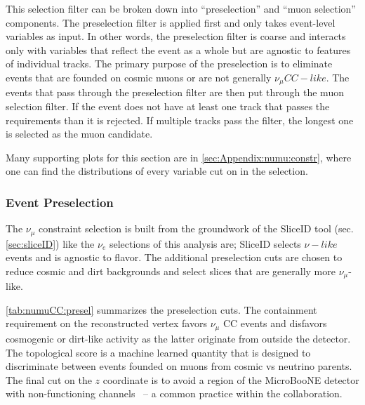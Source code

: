 \par This selection filter can be broken down into ``preselection'' and ``muon selection'' components. The preselection filter is applied first and only takes event-level variables as input. In other words, the preselection filter is coarse and interacts only with variables that reflect the event as a whole but are agnostic to features of individual tracks. The primary purpose of the preselection is to eliminate events that are founded on cosmic muons or are not generally $\nu_{\mu} CC-like$. The events that pass through the preselection filter are then put through the muon selection filter. If the event does not have at least one track that passes the requirements than it is rejected. If multiple tracks pass the filter, the longest one is selected as the muon candidate. 

\par Many supporting plots for this section are in \cref{sec:Appendix:numu:constr}, where one can find the distributions of every variable cut on in the selection. 

\subsubsection{Event Preselection}
\label{sssec:NuMUCCsel:constr:preselec}

\par The $\nu_{\mu}$ constraint selection is built from the groundwork of the SliceID tool (sec. \ref{sec:sliceID}) like the $\nu_e$ selections of this analysis are; SliceID selects $\nu-like$ events and is agnostic to flavor. The additional preselection cuts are chosen to reduce cosmic and dirt backgrounds and select slices that are generally more $\nu_{\mu}$-like. 

\par \cref{tab:numuCC:presel} summarizes the preselection cuts. 
The containment requirement on the reconstructed vertex favors $\nu_{\mu}$ CC events and disfavors cosmogenic or dirt-like activity as the latter originate from outside the detector. The topological score is a machine learned quantity that is designed to discriminate between events founded on muons from cosmic vs neutrino parents. The final cut on the $z$ coordinate is to avoid a region of the MicroBooNE detector with non-functioning channels~\cite{bib:noise} -- a common practice within the collaboration. \\

